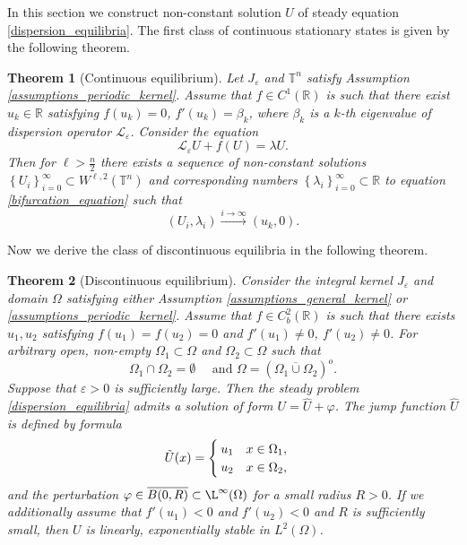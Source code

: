 \documentclass[12pt, a4paper]{article}
\theoremstyle{break}
\newtheorem{thm}{Theorem}[section]
\theoremstyle{break}
\theoremstyle{break}
\theoremstyle{break}
\theoremstyle{break}
\newcommand{\Leo}{\mathcal{L}_{\varepsilon}}
\newcommand{\Seq}[2]{\left\{#1_#2\right\}_{#2 = 0}^\infty}
\begin{document}
In this section we construct non-constant solution $U$ of steady equation \eqref{dispersion_equilibria}. The first class of continuous stationary states is given by the following theorem.

\begin{thm}[Continuous equilibrium]
    Let $J_\varepsilon$ and $\mathbb{T}^n$ satisfy Assumption \ref{assumptions_periodic_kernel}. Assume that $f \in C^1(\mathbb{R})$ is such that there exist $u_k \in \mathbb{R}$ satisfying $f(u_k) = 0$, $f'(u_k) = \beta_k$, where $\beta_k$ is a $k$-th eigenvalue of dispersion operator $\Leo$. Consider the equation
    \begin{equation}
        \Leo U + f(U) = \lambda U.
        \label{bifurcation_equation}
    \end{equation}
    Then for $\ell > \frac{n}{2}$ there exists a sequence of non-constant solutions $\Seq{U}{i} \subset W^{\ell,2}(\mathbb{T}^n)$ and corresponding numbers $\Seq{\lambda}{i} \subset \mathbb{R}$ to equation \eqref{bifurcation_equation} such that
    \begin{equation*}
        (U_i, \lambda_i) \xrightarrow{i \rightarrow \infty} (u_k, 0).
    \end{equation*}
    \label{thm:continous_ss_existence}
\end{thm}

Now we derive the class of discontinuous equilibria in the following theorem.

\begin{thm}[Discontinuous equilibrium]
    Consider the integral kernel $J_\varepsilon$ and domain $\Omega$ satisfying either Assumption \ref{assumptions_general_kernel} or \ref{assumptions_periodic_kernel}. Assume that $f \in C^2_b(\mathbb{R})$ is such that there exists $u_1, u_2$ satisfying $f(u_1) = f(u_2) = 0$ and $f'(u_1) \neq 0$, $f'(u_2) \neq 0$. For arbitrary open, non-empty $\Omega_1 \subset \Omega$ and $\Omega_2 \subset \Omega$ such that
    \begin{equation}
        \Omega_1 \cap \Omega_2 = \emptyset \quad \text{ and } \Omega = \left(\overline{\Omega_1 \cup \Omega_2}\right)^o. \label{omega_partition}
    \end{equation}
    Suppose that $\varepsilon > 0$ is sufficiently large. Then the steady problem \eqref{dispersion_equilibria} admits a solution of form $U = \hat{U} + \varphi$. The jump function $\hat{U}$ is defined by formula
    \begin{equation}
        \Tilde{U}(x) = \begin{cases}
            u_1 \quad x \in \Omega_1, \\
            u_2 \quad x \in \Omega_2,
        \end{cases}
        \label{jump_function}
    \end{equation}
    and the perturbation $\varphi \in \overline{B(0, R)} \subset \L^\infty(\Omega)$ for a small radius $R > 0$. If we additionally assume that $f'(u_1) < 0$ and $f'(u_2) < 0$ and $R$ is sufficiently small, then $U$ is linearly, exponentially stable in $L^2(\Omega)$.
    \label{thm:discontinous_ss}
\end{thm}
\end{document}
